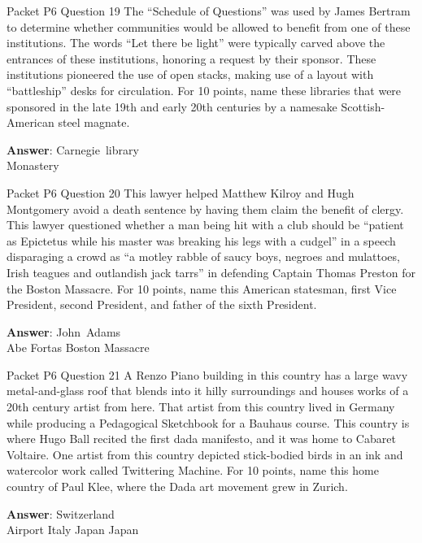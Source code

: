 \begin{frame}{Packet P6 Question 19}
The “Schedule of Questions” was used by James Bertram to determine whether communities would be allowed   to benefit from one of these institutions. The words “Let there be light” were typically carved above the entrances of these institutions, honoring a request by their sponsor. These institutions pioneered   the use of open stacks, making use of a layout with “battleship” desks for   circulation. For 10 points, name these libraries that were sponsored in the late 19th and early 20th centuries by a namesake Scottish-American steel magnate.  

\textbf{Answer}: Carnegie\ library\\
 Monastery
\end{frame}

\begin{frame}{Packet P6 Question 20}
This lawyer helped Matthew Kilroy and Hugh Montgomery avoid a death sentence by having them claim the benefit of clergy. This lawyer questioned whether a man being hit with a club should be “patient as   Epictetus while his master was breaking his legs with a cudgel” in a speech disparaging a crowd as “a motley rabble of saucy boys, negroes and mulattoes, Irish teagues and outlandish jack tarrs” in defending Captain Thomas Preston for the Boston     Massacre.  For 10 points, name this American statesman, first Vice President, second President, and father of the   sixth President.

\textbf{Answer}: John\ Adams\\
 Abe Fortas
 Boston Massacre
\end{frame}

\begin{frame}{Packet P6 Question 21}
A Renzo Piano building   in this country has     a large wavy metal-and-glass roof that blends into it hilly surroundings and houses works of a 20th century artist from here. That artist from this country lived in Germany while producing a Pedagogical Sketchbook for a Bauhaus course. This country is where Hugo Ball recited the first dada manifesto, and it was home to Cabaret Voltaire. One artist from this country depicted stick-bodied birds in an ink and watercolor work called Twittering Machine. For 10   points, name this home country of Paul Klee, where the Dada art movement grew in Zurich.  

\textbf{Answer}: Switzerland\\
 Airport
 Italy
 Japan
 Japan
\end{frame}

